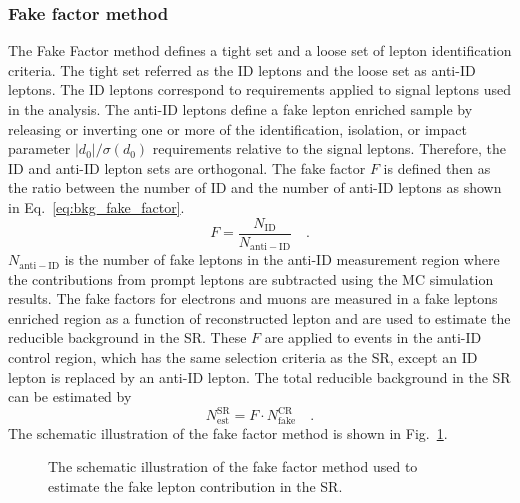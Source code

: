 \subsubsection{Fake factor method}
\label{subsubsec:bkg_fake_factor_method}
The Fake Factor method defines a tight set and a loose set of lepton identification criteria.
The tight set referred as the ID leptons and the loose set as anti-ID leptons.
The ID leptons correspond to requirements applied to signal leptons used in the analysis.
The anti-ID leptons define a fake lepton enriched sample by releasing or inverting one or more of the identification, isolation, or impact parameter $|d_{0}|/\sigma(d_{0})$ requirements relative to the signal leptons.
Therefore, the ID and anti-ID lepton sets are orthogonal.
The fake factor $F$ is defined then as the ratio between the number of ID and the number of anti-ID leptons as shown in Eq.~\ref{eq:bkg_fake_factor}.
%
\begin{equation}
    F = \frac{N_\mathrm{ID}}{N_\mathrm{anti-ID}} \quad .
    \label{eq:bkg_fake_factor}
\end{equation}
%
$N_\mathrm{anti-ID}$ is the number of fake leptons in the anti-ID measurement region where the contributions from prompt leptons are subtracted using the MC simulation results.
The fake factors for electrons and muons are measured in a fake leptons enriched region as a function of reconstructed lepton \pt and are used to estimate the reducible background in the SR.
These $F$ are applied to events in the anti-ID control region, which has the same selection criteria as the SR, except an ID lepton is replaced by an anti-ID lepton.
The total reducible background in the SR can be estimated by
%
\begin{equation}
    N^\mathrm{SR}_\mathrm{est} = F \cdot N^\mathrm{CR}_\mathrm{fake} \quad .
    \label{eq:bkg_estimated_fake_leptons}
\end{equation}
%
The schematic illustration of the fake factor method is shown in Fig.~\ref{fig:bkg_fake_factor_method}.

\begin{figure}[htb]
    \begin{center}
        
        \caption{The schematic illustration of the fake factor method used to estimate the fake lepton contribution in the SR.}
        \label{fig:bkg_fake_factor_method}
    \end{center}
\end{figure}

